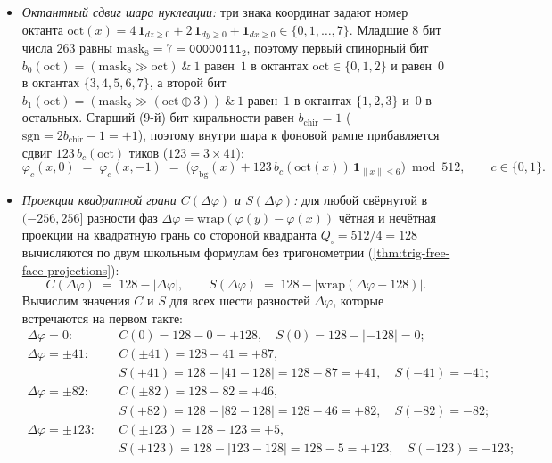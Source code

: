 \begin{corollary}[Единство природы и количества заряда: частное и остаток одного деления на $\phaseRingCount = 512$]
\begin{enumerate}[label=(\roman*)]
\begin{itemize}[nosep,leftmargin=*]
  \item \emph{Октантный сдвиг шара нуклеации:} три знака координат задают номер октанта $\mathrm{oct}(x) = 4\,\mathbf{1}_{dz\ge 0} + 2\,\mathbf{1}_{dy\ge 0} + \mathbf{1}_{dx\ge 0} \in \{0,1,\dots,7\}$. Младшие $8$ бит числа $263$ равны $\mathrm{mask}_8 = 7 = \mathtt{00000111}_2$, поэтому первый спинорный бит $b_0(\mathrm{oct}) = (\mathrm{mask}_8 \gg \mathrm{oct})\ \&\ 1$ равен~$1$ в октантах $\mathrm{oct}\in\{0,1,2\}$ и равен~$0$ в октантах $\{3,4,5,6,7\}$, а второй бит $b_1(\mathrm{oct}) = (\mathrm{mask}_8 \gg (\mathrm{oct}\oplus 3))\ \&\ 1$ равен~$1$ в октантах $\{1,2,3\}$ и~$0$ в остальных. Старший ($9$-й) бит киральности равен $b_{\mathrm{chir}}=1$ ($\mathrm{sgn} = 2b_{\mathrm{chir}}-1 = +1$), поэтому внутри шара к фоновой рампе прибавляется сдвиг $123\,b_c(\mathrm{oct})$ тиков ($123 = 3\times 41$):
    \[
      \varphi_c(x,0) \;=\; \varphi_c(x,-1) \;=\; \bigl(\varphi_{\mathrm{bg}}(x) + 123\,b_c(\mathrm{oct}(x))\,\mathbf{1}_{\|x\|\le 6}\bigr)\bmod 512,
      \qquad c\in\{0,1\}.
    \]
  \item \emph{Проекции квадратной грани $C(\Delta\varphi)$ и $S(\Delta\varphi)$:} для любой свёрнутой в $(-256,256]$ разности фаз $\Delta\varphi = \mathrm{wrap}(\varphi(y)-\varphi(x))$ чётная и нечётная проекции на квадратную грань со стороной квадранта $Q_\square = 512/4 = 128$ вычисляются по двум школьным формулам без тригонометрии (\cref{thm:trig-free-face-projections}):
    \[
      C(\Delta\varphi) \;=\; 128 - |\Delta\varphi|,
      \qquad
      S(\Delta\varphi) \;=\; 128 - \bigl|\mathrm{wrap}(\Delta\varphi - 128)\bigr|.
    \]
    Вычислим значения $C$ и $S$ для всех шести разностей $\Delta\varphi$, которые встречаются на первом такте:
    \begin{align*}
      \Delta\varphi = 0\colon &\quad C(0) = 128 - 0 = +128,\quad S(0) = 128 - |-128| = 0;\\
      \Delta\varphi = \pm 41\colon &\quad C(\pm 41) = 128 - 41 = +87,\\
      &\quad S(+41) = 128 - |41-128| = 128 - 87 = +41,\quad S(-41) = -41;\\
      \Delta\varphi = \pm 82\colon &\quad C(\pm 82) = 128 - 82 = +46,\\
      &\quad S(+82) = 128 - |82-128| = 128 - 46 = +82,\quad S(-82) = -82;\\
      \Delta\varphi = \pm 123\colon &\quad C(\pm 123) = 128 - 123 = +5,\\
      &\quad S(+123) = 128 - |123-128| = 128 - 5 = +123,\quad S(-123) = -123;\\

\end{align*}
\end{itemize}
\end{enumerate}
\end{corollary}
